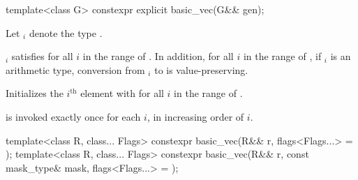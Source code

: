 \begin{itemdecl}
template<class G> constexpr explicit basic_vec(G&& gen);
\end{itemdecl}

\begin{itemdescr}
\pnum
Let $_i$ denote the type
.

\pnum
\constraints
{}$_i$ satisfies  for all $i$ in
the range of .
In addition, for all $i$ in the range of , if $_i$
is an arithmetic type, conversion from $_i$ to 
is value-preserving.

\pnum
\effects
Initializes the $i^\text{th}$ element with
 for all $i$ in the range of .

\pnum
\remarks
{} is invoked exactly once for each $i$, in increasing order of $i$.
\end{itemdescr}

\begin{itemdecl}
template<class R, class... Flags>
  constexpr basic_vec(R&& r, flags<Flags...> = {});
template<class R, class... Flags>
  constexpr basic_vec(R&& r, const mask_type& mask, flags<Flags...> = {});
\end{itemdecl}

